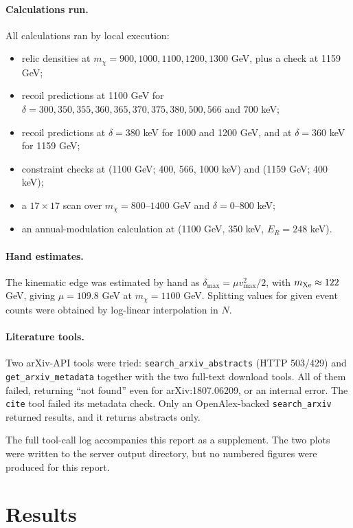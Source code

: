 \documentclass[11pt,a4paper]{article}
\begin{document}
\paragraph{Calculations run.} All calculations ran by local execution:
\begin{itemize}
\item relic densities at $m_\chi = 900, 1000, 1100, 1200, 1300$ GeV, plus a check at 1159 GeV;
\item recoil predictions at 1100 GeV for $\delta = 300, 350, 355, 360, 365, 370, 375, 380, 500, 566$ and $700$ keV;
\item recoil predictions at $\delta = 380$ keV for 1000 and 1200 GeV, and at $\delta = 360$ keV for 1159 GeV;
\item constraint checks at (1100 GeV; 400, 566, 1000 keV) and (1159 GeV; 400 keV);
\item a $17\times17$ scan over $m_\chi = 800$--$1400$ GeV and $\delta = 0$--$800$ keV;
\item an annual-modulation calculation at (1100 GeV, 350 keV, $E_R = 248$ keV).
\end{itemize}

\paragraph{Hand estimates.} The kinematic edge was estimated by hand as $\delta_{\max} = \mu v_{\max}^2/2$, with $m_{\rm Xe}\approx122$ GeV, giving $\mu = 109.8$ GeV at $m_\chi = 1100$ GeV. Splitting values for given event counts were obtained by log-linear interpolation in $N$.

\paragraph{Literature tools.} Two arXiv-API tools were tried: \texttt{search\_arxiv\_abstracts} (HTTP 503/429) and \texttt{get\_arxiv\_metadata} together with the two full-text download tools. All of them failed, returning ``not found'' even for arXiv:1807.06209, or an internal error. The \texttt{cite} tool failed its metadata check. Only an OpenAlex-backed \texttt{search\_arxiv} returned results, and it returns abstracts only.

The full tool-call log accompanies this report as a supplement. The two plots were written to the server output directory, but no numbered figures were produced for this report.

\section{Results}
\end{document}
